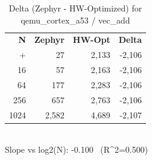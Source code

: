 \begin{table}[tb]
    \centering
    \caption{Delta (Zephyr - HW-Optimized) for qemu_cortex_a53 / vec_add}
    \label{tab:delta_qemu_cortex_a53_vec_add}
    \scriptsize
    \begin{tabular}{r r r r}
        \hline
        \textbf{N} & \textbf{Zephyr} & \textbf{HW-Opt} & \textbf{Delta} \\\n+        \hline
        4 & 27 & 2,133 & -2,106\\
        16 & 57 & 2,163 & -2,106\\
        64 & 177 & 2,283 & -2,106\\
        256 & 657 & 2,763 & -2,106\\
        1024 & 2,582 & 4,689 & -2,107\\
        \hline
    \end{tabular}
    \vspace{2mm}\\\n    Slope vs log2(N): -0.100 \ (R^2=0.500)\n\end{table}

